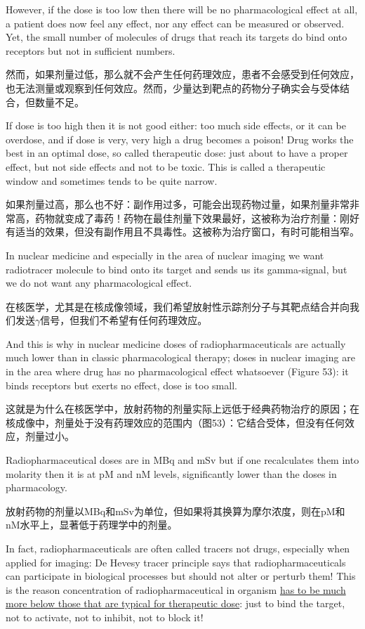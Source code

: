 \documentclass[dvipsnames, svgnames,a4paper,11pt]{article}
\begin{document}
However, if the dose is too low then there will be no pharmacological effect at all, a patient does now feel any effect, nor any effect can be measured or observed. Yet, the small number of molecules of drugs that reach its targets do bind onto receptors but not in sufficient numbers.

然而，如果剂量过低，那么就不会产生任何药理效应，患者不会感受到任何效应，也无法测量或观察到任何效应。然而，少量达到靶点的药物分子确实会与受体结合，但数量不足。

If dose is too high then it is not good either: too much side effects, or it can be overdose, and if dose is very, very high a drug becomes a poison! Drug works the best in an optimal dose, so called therapeutic dose: just about to have a proper effect, but not side effects and not to be toxic. This is called a therapeutic window and sometimes tends to be quite narrow.

如果剂量过高，那么也不好：副作用过多，可能会出现药物过量，如果剂量非常非常高，药物就变成了毒药！药物在最佳剂量下效果最好，这被称为治疗剂量：刚好有适当的效果，但没有副作用且不具毒性。这被称为治疗窗口，有时可能相当窄。

In nuclear medicine and especially in the area of nuclear imaging we want radiotracer molecule to bind onto its target and sends us its gamma-signal, but we do not want any pharmacological effect.

在核医学，尤其是在核成像领域，我们希望放射性示踪剂分子与其靶点结合并向我们发送$\gamma$信号，但我们不希望有任何药理效应。

And this is why in nuclear medicine doses of radiopharmaceuticals are actually much lower than in classic pharmacological therapy; doses in nuclear imaging are in the area where drug has no pharmacological effect whatsoever (Figure 53): it binds receptors but exerts no effect, dose is too small.

这就是为什么在核医学中，放射药物的剂量实际上远低于经典药物治疗的原因；在核成像中，剂量处于没有药理效应的范围内（图53）：它结合受体，但没有任何效应，剂量过小。

Radiopharmaceutical doses are in MBq and mSv but if one recalculates them into molarity then it is at pM and nM levels, significantly lower than the doses in pharmacology.

放射药物的剂量以MBq和mSv为单位，但如果将其换算为摩尔浓度，则在pM和nM水平上，显著低于药理学中的剂量。

In fact, radiopharmaceuticals are often called tracers not drugs, especially when applied for imaging: De Hevesy tracer principle says that radiopharmaceuticals can participate in biological processes but should not alter or perturb them! This is the reason concentration of radiopharmaceutical in organism \underline{has to be much more below those that are typical for therapeutic dose}: just to bind the target, not to activate, not to inhibit, not to block it!
\end{document}
